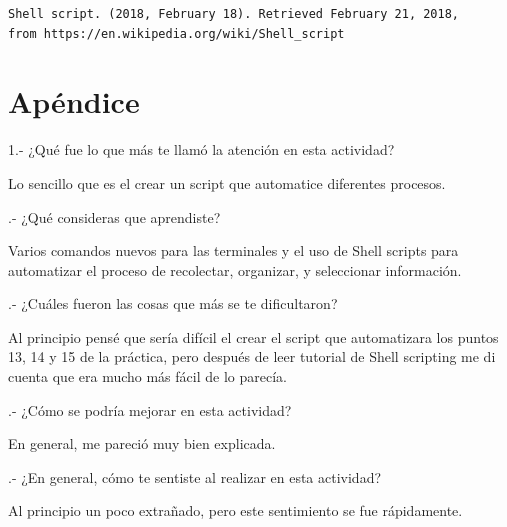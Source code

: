 \documentclass{article}
\begin{document}
\begin{verbatim}
Shell script. (2018, February 18). Retrieved February 21, 2018, 
from https://en.wikipedia.org/wiki/Shell_script 
\end{verbatim}

\section{Apéndice}

			1.- ¿Qué fue lo que más te llamó la atención en esta actividad?
    
    \vspace{0.3cm}
 	Lo sencillo que es el crear un script que automatice diferentes procesos.
    \vspace{0.3cm}
    
.- ¿Qué consideras que aprendiste?
    
    \vspace{0.3cm}
    Varios comandos nuevos para las terminales y el uso de Shell scripts para automatizar el proceso de recolectar, organizar, y seleccionar información.
    \vspace{0.3cm}
    
.- ¿Cuáles fueron las cosas que más se te dificultaron?
    
    \vspace{0.3cm}
    Al principio pensé que sería difícil el crear el script que automatizara los puntos 13, 14 y 15 de la práctica, pero después de leer tutorial de Shell scripting me di cuenta que era mucho más fácil de lo parecía.
    \vspace{0.3cm}
    
.- ¿Cómo se podría mejorar en esta actividad?
    
    \vspace{0.3cm}
    En general, me pareció muy bien explicada.
    \vspace{0.3cm}
    
.- ¿En general, cómo te sentiste al realizar en esta actividad? 
    
    \vspace{0.3cm}
    Al principio un poco extrañado, pero este sentimiento se fue rápidamente.
    \vspace{0.3cm}
\end{document}
